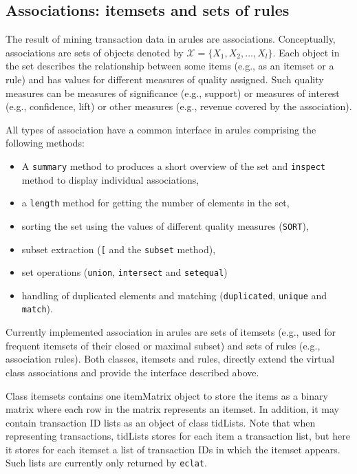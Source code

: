 \documentclass[10pt,a4paper]{article}
\newcommand{\strong}[1]{{\normalfont\fontseries{b}\selectfont #1}}
\newcommand{\class}[1]{\textsf{#1}}
\newcommand{\code}[1]{\texttt{#1}}
\newcommand{\pkg}[1]{\strong{#1}}
\newcommand{\set}[1]{\mathcal{#1}}
\begin{document}
\subsection{Associations: itemsets and sets of rules\label{sec:associations}}

The result of mining transaction data in \pkg{arules} are
\class{associations.} 
Conceptually, associations are sets of 
objects denoted by $\set{X} = \{X_1, X_2, \ldots, X_l\}$. 
Each object in the set describes the relationship between some items (e.g., 
as an itemset or a rule) and
has values for different measures of quality assigned.
Such quality measures can be measures of significance (e.g., support) 
or measures of interest (e.g., confidence, lift)
or other measures (e.g., revenue covered by the association).

All types of association have a common interface in \pkg{arules} comprising
the following methods:
\begin{itemize}
\item A \code{summary} method to produces a short overview of the set and
\code{inspect} method to display individual associations,
\item a \code{length} method for getting the number of elements in the set,
\item sorting the set using the values of different quality measures
	(\code{SORT}), 
\item subset extraction (\code{[} and the \code{subset} method),
\item set operations (\code{union}, \code{intersect} and \code{setequal})
\item handling of duplicated elements and matching
	(\code{duplicated}, \code{unique} and \code{match}).
\end{itemize}

Currently implemented association in \pkg{arules} are
sets of itemsets (e.g., used for frequent itemsets of their 
closed or maximal subset) and
sets of rules (e.g., association rules).
Both classes, \class{itemsets} and \class{rules}, directly extend the
virtual class \class{associations} and provide the interface described above.

Class \class{itemsets} contains one \class{itemMatrix} object to store
the items as a binary matrix where each row in the matrix represents an
itemset. In addition, it may contain
transaction ID lists as an object of class \class{tidLists}. 
Note that when representing transactions, \class{tidLists}
stores for each item a transaction list, but here
it stores for each itemset a list of transaction IDs in which the itemset
appears. Such lists are currently only returned by \code{eclat}.
\end{document}
